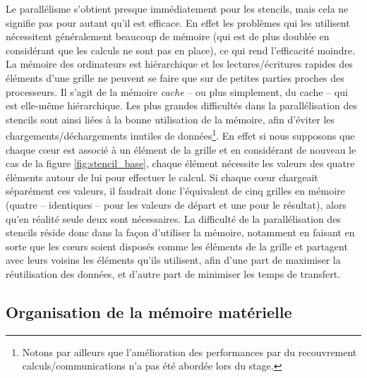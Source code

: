 Le parallélisme s'obtient presque immédiatement pour les stencils, mais cela ne signifie pas pour autant qu'il est efficace. En effet les problèmes qui les utilisent nécessitent généralement beaucoup de mémoire (qui est de plus doublée en considérant que les calculs ne sont pas en place), ce qui rend l'efficacité moindre. La mémoire des ordinateurs est hiérarchique et les lectures/écritures rapides des éléments d'une grille ne peuvent se faire que sur de petites parties proches des processeurs. Il s'agit de la mémoire \emph{cache} -- ou plus simplement, du cache -- qui est elle-même hiérarchique. Les plus grandes difficultés dans la parallélisation des stencils sont ainsi liées à la bonne utilisation de la mémoire, afin d'éviter les chargements/déchargements inutiles de données\footnote{Notons par ailleurs que l'amélioration des performances par du recouvrement calculs/communications n'a pas été abordée lors du stage.}. En effet si nous supposons que chaque cœur est associé à un élément de la grille et en considérant de nouveau le cas de la figure \ref{fig:stencil_base}, chaque élément nécessite les valeurs des quatre éléments autour de lui pour effectuer le calcul. Si chaque cœur chargeait séparément ces valeurs, il faudrait donc l'équivalent de cinq grilles en mémoire (quatre -- identiques -- pour les valeurs de départ et une pour le résultat), alors qu'en réalité seule deux sont nécessaires. La difficulté de la parallélisation des stencils réside donc dans la façon d'utiliser la mémoire, notamment en faisant en sorte que les cœurs soient disposés comme les éléments de la grille et partagent avec leurs voisins les éléments qu'ils utilisent, afin d'une part de maximiser la réutilisation des données, et d'autre part de minimiser les temps de transfert.

\subsection{Organisation de la mémoire matérielle}

